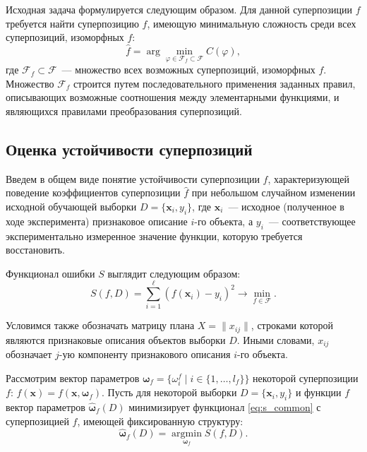 \documentclass[12pt,a4paper]{article}
\begin{document}
Исходная задача формулируется следующим образом. Для данной
суперпозиции $f$ требуется найти суперпозицию $\hat{f}$, имеющую минимальную
сложность среди всех суперпозиций, изоморфных $f$:
\[
\hat{f} = \arg \min_{\varphi \in \mathcal{F}_f \subset \mathcal{F}} C (\varphi),
\]
где $\mathcal{F}_f \subset \mathcal{F}$~--- множество всех возможных
суперпозиций, изоморфных $f$. Множество $\mathcal{F}_f$ строится путем
последовательного применения заданных правил, описывающих возможные соотношения
между элементарными функциями, и являющихся правилами преобразования
суперпозиций.

\subsection{Оценка устойчивости суперпозиций}
Введем в общем виде понятие устойчивости суперпозиции $f$, характеризующей
поведение коэффициентов суперпозиции $\hat{f}$ при небольшом случайном
изменении исходной обучающей выборки
$D = \{ \mathbf{x}_i, y_i \}$,
где $\mathbf{x}_i$~--- исходное (полученное в ходе эксперимента)
признаковое описание $i$-го объекта, а $y_i$~--- соответствующее экспериментально
измеренное значение функции, которую требуется восстановить.

Функционал ошибки $S$ выглядит следующим образом: 
\begin{equation}
  S(f, D) = \sum_{i = 1}^\ell (f(\mathbf{x}_i) - y_i)^2 \rightarrow \min_{f \in \mathcal{F}}.
  \label{eq:s_common}
\end{equation}

Условимся также обозначать матрицу плана $X = \| x_{ij} \|$, строками которой
являются признаковые описания объектов выборки $D$. Иными словами, $x_{ij}$
обозначает $j$-ую компоненту признакового описания $i$-го объекта.

Рассмотрим вектор параметров
$\boldsymbol{\omega}_f = \{ \omega_i^f \mid i \in \{ 1, \dots, l_f \} \}$
некоторой суперпозиции $f$: $f(\mathbf{x}) = f(\mathbf{x}, \boldsymbol{\omega}_f)$.
Пусть для некоторой выборки $D = \{ \mathbf{x}_i, y_i \}$ и функции
$f$ вектор параметров $\hat{\boldsymbol{\omega}}_f(D)$ минимизирует
функционал \eqref{eq:s_common} с суперпозицией $f$, имеющей фиксированную
структуру:
\[
  \hat{\boldsymbol{\omega}}_f(D) = \mathop{\arg \min}\limits_{\boldsymbol{\omega}_f} S(f, D).
\]
\end{document}
